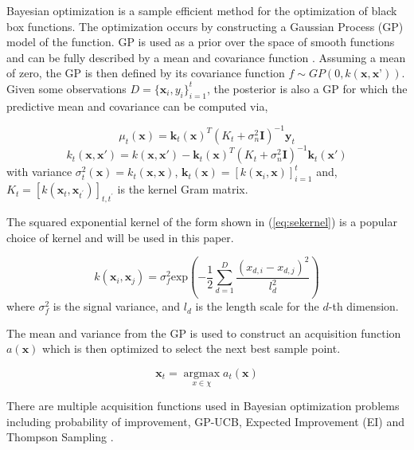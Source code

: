 Bayesian optimization is a sample efficient method for the optimization of black box functions. The optimization occurs by constructing a Gaussian Process (GP) model of the function. GP is used as a prior over the space of smooth functions and can be fully described by a mean and covariance function \cite{Rasmussen:2005:GPM:1162254}. Assuming a mean of zero, the GP is then defined by its covariance function $f \sim GP(0,k(\textbf{x},\textbf{x'}))$. Given some observations $D = \{\textbf{x}_i,y_i\}_{i=1}^{t}$, the posterior is also a GP for which the predictive mean and covariance can be computed via,

\begin{equation} \label{eq:mu}
\mu_{t}(\textbf{x}) = \textbf{k}_{t}(\textbf{x})^T(K_{t} + \sigma_{n}^2\mathbf{I})^{-1}\textbf{y}_{t}
\end{equation}
\begin{equation} \label{eq:sigma}
k_{t}(\textbf{x},\textbf{x}') = k(\textbf{x},\textbf{x}') - \textbf{k}_t(\textbf{x})^T(K_t + \sigma_{n}^2\mathbf{I})^{-1}\textbf{k}_t(\textbf{x}')
\end{equation}
with variance $\sigma_{t}^2(\textbf{x}) = k_{t}(\textbf{x},\textbf{x})$, $\textbf{k}_t(\textbf{x}) = [k(\textbf{x}_i,\textbf{x})]_{i=1}^t$ and, $K_t = [k(\textbf{x}_t,\textbf{x}_{t^{'}})]_{t,t^{'}}$ is the kernel Gram matrix.

The squared exponential kernel of the form shown in (\ref{eq:sekernel}) is a popular choice of kernel and will be used in this paper.

\begin{equation} \label{eq:sekernel}
k(\textbf{x}_i,\textbf{x}_j) = \sigma_{f}^2 \text{exp}(-\frac{1}{2} \sum_{d=1}^{D} \frac{(x_{d,i} - x_{d,j})^2}{l_{d}^2})
\end{equation}
where $\sigma_{f}^2$ is the signal variance, and $l_{d}$ is the length scale for the $d$-th dimension.

The mean and variance from the GP is used to construct an acquisition function $a(\boldsymbol{x})$ which is then optimized to select the next best sample point. 

\begin{equation}\label{eq:BO_acquisition}
\textbf{x}_{t} = \operatorname*{argmax}_{x\in \chi}  a_{t}(\textbf{x})
\end{equation}

There are multiple acquisition functions used in Bayesian optimization problems including probability of improvement, GP-UCB, Expected Improvement (EI) and Thompson Sampling \cite{DBLP:journals/corr/abs-1012-2599,Basu2017}.